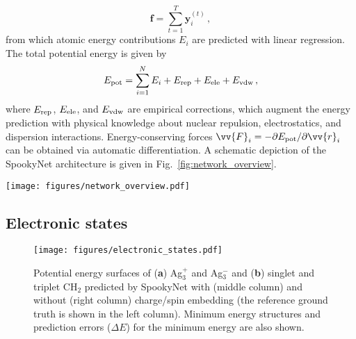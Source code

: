 \documentclass[%
superscriptaddress,
reprint,
nofootinbib,
amsmath,amssymb,amsfonts,
floatfix,
altaffilletter,
showkeys,
]{revtex4-2}
\newcommand{\nn}{SpookyNet}
\begin{document}
\begin{equation}
\mathbf{f} = \sum_{t=1}^{T}\mathbf{y}_i^{(t)}\,,
\label{eq:atomic_descriptor}
\end{equation}
from which atomic energy contributions $E_i$ are predicted with linear regression. The total potential energy is given by
\begin{equation}
E_{\rm pot} = \sum_{i=1}^{N}E_i + E_{\rm rep} + E_{\rm ele} + E_{\rm vdw}\,,
\label{eq:potential_energy}
\end{equation}
where $E_{\rm rep}$, $E_{\rm ele}$, and $E_{\rm vdw}$ are empirical corrections, which augment the energy prediction with physical knowledge about nuclear repulsion, electrostatics, and dispersion interactions. Energy-conserving forces $\vv{F}_i = -\partial E_{\rm pot}/\partial \vv{r}_i$ can be obtained via automatic differentiation. A schematic depiction of the \nn{} architecture is given in Fig.~\ref{fig:network_overview}.

\begin{figure*}
	\texttt{[image: figures/network\_overview.pdf]}
	\caption{Schematic depiction of the \nn{} architecture with color-coded view of individual components. (\textbf{a}) Architecture overview, for details on the nuclear and electronic (charge/spin) embeddings and basis functions, refer to Eqs.~\ref{eq:nuclear_embedding},~\ref{eq:electronic_embedding}~and~\ref{eq:basis_functions}, respectively. (\textbf{b}) Interaction module, see Eq.~\ref{eq:interaction_module}. (\textbf{c}) Local interaction block, see Eq.~\ref{eq:local_interaction}. (\textbf{d}) Nonlocal interaction block, see Eq.~\ref{eq:nonlocal_interaction}. (\textbf{e}) Residual multilayer perceptron (MLP), see Eq.~\ref{eq:resmlp}. (\textbf{f}) Pre-activation residual block, see Eq.~\ref{eq:residual}.}
	\label{fig:network_overview}
\end{figure*}

\subsection*{Electronic states}
\label{sec:electronic_states}
\begin{figure}
	\texttt{[image: figures/electronic\_states.pdf]}
	\caption{Potential energy surfaces of (\textbf{a}) Ag$_3^+$ and Ag$_3^-$ and (\textbf{b}) singlet and triplet CH$_2$ predicted by \nn{} with (middle column) and without (right column) charge/spin embedding (the reference ground truth is shown in the left column). Minimum energy structures and prediction errors ($\Delta E$) for the minimum energy are also shown.}
	\label{fig:electronic_states}
\end{figure}
\end{document}
